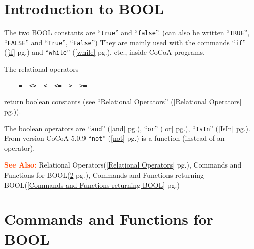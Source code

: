 \documentclass[a4paper]{mybook}
\newcommand\SeeAlso{\par\textcolor{OrangeRed}{\textbf{\large See Also: }}}
\begin{document}
      

\section{Introduction to BOOL}
\label{Introduction to BOOL}

        
The two BOOL constants are ``\verb&true&'' and ``\verb&false&''.
(can also be written
``\verb&TRUE&'', ``\verb&FALSE&'' and ``\verb&True&'', ``\verb&False&'')
They are mainly used with the commands ``\verb&if&'' (\ref{if} pg.\pageref{if})
and ``\verb&while&'' (\ref{while} pg.\pageref{while}), etc., inside CoCoA programs.
\par 
The relational operators
\begin{verbatim}
    =  <>  <  <=  >  >=
\end{verbatim}
return boolean constants (see ``Relational Operators'' (\ref{Relational Operators} pg.\pageref{Relational Operators})).
\par 
The boolean operators are ``\verb&and&'' (\ref{and} pg.\pageref{and}), ``\verb&or&'' (\ref{or} pg.\pageref{or}), ``\verb&IsIn&'' (\ref{IsIn} pg.\pageref{IsIn}).
From version CoCoA-5.0.9 ``\verb&not&'' (\ref{not} pg.\pageref{not}) is a function (instead of
an operator).

\SeeAlso %
  Relational Operators(\ref{Relational Operators} pg.\pageref{Relational Operators}), 
    Commands and Functions for BOOL(\ref{Commands and Functions for BOOL} pg.\pageref{Commands and Functions for BOOL}), 
    Commands and Functions returning BOOL(\ref{Commands and Functions returning BOOL} pg.\pageref{Commands and Functions returning BOOL})

\section{Commands and Functions for BOOL}
\label{Commands and Functions for BOOL}

        
\end{document}
